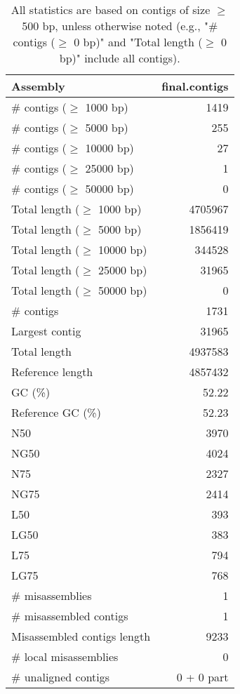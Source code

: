 \documentclass[12pt,a4paper]{article}
\begin{document}
\begin{table}[ht]
\begin{center}
\caption{All statistics are based on contigs of size $\geq$ 500 bp, unless otherwise noted (e.g., "\# contigs ($\geq$ 0 bp)" and "Total length ($\geq$ 0 bp)" include all contigs).}
\begin{tabular}{|l*{1}{|r}|}
\hline
Assembly & final.contigs \\ \hline
\# contigs ($\geq$ 1000 bp) & 1419 \\ \hline
\# contigs ($\geq$ 5000 bp) & 255 \\ \hline
\# contigs ($\geq$ 10000 bp) & 27 \\ \hline
\# contigs ($\geq$ 25000 bp) & 1 \\ \hline
\# contigs ($\geq$ 50000 bp) & 0 \\ \hline
Total length ($\geq$ 1000 bp) & 4705967 \\ \hline
Total length ($\geq$ 5000 bp) & 1856419 \\ \hline
Total length ($\geq$ 10000 bp) & 344528 \\ \hline
Total length ($\geq$ 25000 bp) & 31965 \\ \hline
Total length ($\geq$ 50000 bp) & 0 \\ \hline
\# contigs & 1731 \\ \hline
Largest contig & 31965 \\ \hline
Total length & 4937583 \\ \hline
Reference length & 4857432 \\ \hline
GC (\%) & 52.22 \\ \hline
Reference GC (\%) & 52.23 \\ \hline
N50 & 3970 \\ \hline
NG50 & 4024 \\ \hline
N75 & 2327 \\ \hline
NG75 & 2414 \\ \hline
L50 & 393 \\ \hline
LG50 & 383 \\ \hline
L75 & 794 \\ \hline
LG75 & 768 \\ \hline
\# misassemblies & 1 \\ \hline
\# misassembled contigs & 1 \\ \hline
Misassembled contigs length & 9233 \\ \hline
\# local misassemblies & 0 \\ \hline
\# unaligned contigs & 0 + 0 part \\ \hline

\end{tabular}
\end{center}
\end{table}
\end{document}
